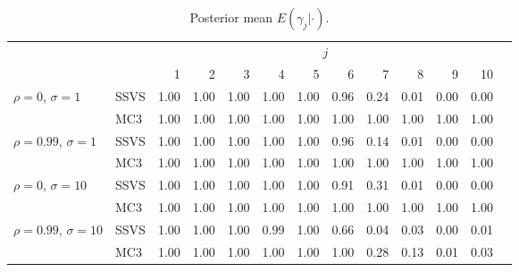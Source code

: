 \documentclass[12pt]{article}
\begin{document}
\begin{table}[ht]
\centering
\begin{tabular}{llrrrrrrrrrrr}
  \hline\hline
 & & \multicolumn{10}{c}{$j$} \\
 & & 1 & 2 & 3 & 4 & 5 & 6 & 7 & 8 & 9 & 10 \\ 
  \hline
\multirow{2}{*}{$\rho=0$, $\sigma=1$} & SSVS & 1.00 & 1.00 & 1.00 & 1.00 & 1.00 & 0.96 & 0.24 & 0.01 & 0.00 & 0.00 \\ 
 & MC3  & 1.00 & 1.00 & 1.00 & 1.00 & 1.00 & 1.00 & 1.00 & 1.00 & 1.00 & 1.00 \\  \hline
\multirow{2}{*}{$\rho=0.99$, $\sigma=1$} & SSVS & 1.00 & 1.00 & 1.00 & 1.00 & 1.00 & 0.96 & 0.14 & 0.01 & 0.00 & 0.00 \\ 
 & MC3  & 1.00 & 1.00 & 1.00 & 1.00 & 1.00 & 1.00 & 1.00 & 1.00 & 1.00 & 1.00 \\  \hline
\multirow{2}{*}{$\rho=0$, $\sigma=10$} & SSVS & 1.00 & 1.00 & 1.00 & 1.00 & 1.00 & 0.91 & 0.31 & 0.01 & 0.00 & 0.00 \\ 
 & MC3  & 1.00 & 1.00 & 1.00 & 1.00 & 1.00 & 1.00 & 1.00 & 1.00 & 1.00 & 1.00 \\  \hline 
\multirow{2}{*}{$\rho=0.99$, $\sigma=10$} & SSVS & 1.00 & 1.00 & 1.00 & 0.99 & 1.00 & 0.66 & 0.04 & 0.03 & 0.00 & 0.01 \\ 
 & MC3  & 1.00 & 1.00 & 1.00 & 1.00 & 1.00 & 1.00 & 0.28 & 0.13 & 0.01 & 0.03 \\ 
   \hline\hline
\end{tabular}
\caption{Posterior mean $E(\gamma_j|\cdot)$.}
\end{table}








\end{document}
